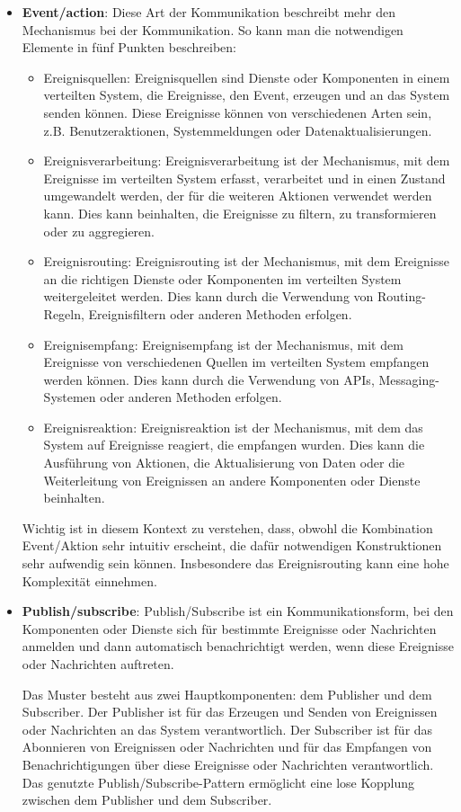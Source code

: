 \begin{itemize}
\item \textbf{Event/action}: Diese Art der Kommunikation beschreibt mehr den Mechanismus bei der Kommunikation. So kann man die notwendigen Elemente in fünf Punkten beschreiben:
\begin{itemize}
\item Ereignisquellen: Ereignisquellen sind Dienste oder Komponenten in einem verteilten System, die Ereignisse, den Event, erzeugen und an das System senden können. Diese Ereignisse können von verschiedenen Arten sein, z.B. Benutzeraktionen, Systemmeldungen oder Datenaktualisierungen.
\item Ereignisverarbeitung: Ereignisverarbeitung ist der Mechanismus, mit dem Ereignisse im verteilten System erfasst, verarbeitet und in einen Zustand umgewandelt werden, der für die weiteren Aktionen verwendet werden kann. Dies kann beinhalten, die Ereignisse zu filtern, zu transformieren oder zu aggregieren.
\item Ereignisrouting: Ereignisrouting ist der Mechanismus, mit dem Ereignisse an die richtigen Dienste oder Komponenten im verteilten System weitergeleitet werden. Dies kann durch die Verwendung von Routing-Regeln, Ereignisfiltern oder anderen Methoden erfolgen.
\item Ereignisempfang: Ereignisempfang ist der Mechanismus, mit dem Ereignisse von verschiedenen Quellen im verteilten System empfangen werden können. Dies kann durch die Verwendung von APIs, Messaging-Systemen oder anderen Methoden erfolgen.
\item Ereignisreaktion: Ereignisreaktion ist der Mechanismus, mit dem das System auf Ereignisse reagiert, die empfangen wurden. Dies kann die Ausführung von Aktionen, die Aktualisierung von Daten oder die Weiterleitung von Ereignissen an andere Komponenten oder Dienste beinhalten.
\end{itemize}
Wichtig ist in diesem Kontext zu verstehen, dass, obwohl die Kombination Event/Aktion sehr intuitiv erscheint, die dafür notwendigen Konstruktionen sehr aufwendig sein können. Insbesondere das Ereignisrouting kann eine hohe Komplexität einnehmen. 

\item \textbf{Publish/subscribe}: Publish/Subscribe ist ein Kommunikationsform, bei den Komponenten oder Dienste sich für bestimmte Ereignisse oder Nachrichten anmelden und dann automatisch benachrichtigt werden, wenn diese Ereignisse oder Nachrichten auftreten.

Das Muster besteht aus zwei Hauptkomponenten: dem Publisher und dem Subscriber. Der Publisher ist für das Erzeugen und Senden von Ereignissen oder Nachrichten an das System verantwortlich. Der Subscriber ist für das Abonnieren von Ereignissen oder Nachrichten und für das Empfangen von Benachrichtigungen über diese Ereignisse oder Nachrichten verantwortlich. Das genutzte Publish/Subscribe-Pattern ermöglicht eine lose Kopplung zwischen dem Publisher und dem Subscriber. 


\end{itemize}

